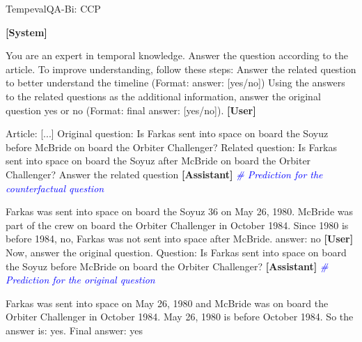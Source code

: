 \begin{myColorbox}[]{TempevalQA-Bi: CCP}

\textbf{[System]}

You are an expert in temporal knowledge. Answer the question according to the article. To improve understanding, follow these steps: Answer the related question to better understand the timeline (Format: answer: [yes/no]) Using the answers to the related questions as the additional information, answer the original question yes or no (Format: final answer: [yes/no]). \newline 
\textbf{[User]}

Article: [...]\newline
Original question: Is Farkas sent into space on board the Soyuz before McBride on board the Orbiter Challenger?\newline
Related question: Is Farkas sent into space on board the Soyuz after McBride on board the Orbiter Challenger?\newline 
Answer the related question\newline
\textbf{[Assistant]} \textit{\textcolor{blue}{\# Prediction for the counterfactual question}}

Farkas was sent into space on board the Soyuz 36 on May 26, 1980. McBride was part of the crew on board the Orbiter Challenger in October 1984. 
Since 1980 is before 1984, no, Farkas was not sent into space after McBride.\newline
answer: no\newline 
\textbf{[User]}
\newline
Now, answer the original question. Question: Is Farkas sent into space on board the Soyuz before McBride on board the Orbiter Challenger?\newline
\textbf{[Assistant]} \textit{\textcolor{blue}{\# Prediction for the original question}}

Farkas was sent into space on May 26, 1980 and McBride was on board the Orbiter Challenger in October 1984. May 26, 1980 is before October 1984. So the answer is: yes. \newline
Final answer: yes

\end{myColorbox}
